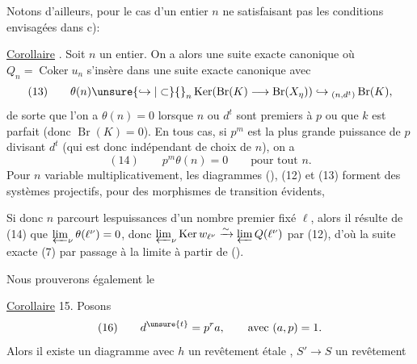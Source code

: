 
Notons d'ailleurs, pour le cas d'un entier $n$ ne satisfaisant pas  les conditions envisagées dans c):

\uline{Corollaire} . Soit $n$ un entier. On a alors une suite exacte canonique
où $Q_n=\operatorname{Coker}u_n$ s'insère dans une suite exacte canonique
avec
\[
(13)\qquad\theta(n)\unsure{\hookrightarrow|\subset}{}_n\operatorname{Ker}(\operatorname{Br}(K)\longrightarrow\operatorname{Br}(X_\eta))\hookrightarrow{}_{(n,d^t)}\operatorname{Br}(K),
\]
de sorte que l'on a $\theta(n)=0$ lorsque $n$ ou $d^t$ sont premiers à $p$ ou que $k$ est parfait (donc $\operatorname{Br}(K)=0$). En tous cas, si $p^m$ est la plus grande puissance de $p$ divisant $d^t$ (qui est donc indépendant de choix de $n$), on a
\[
(14)\qquad p^m\theta(n)=0\qquad\text{pour tout }n.
\]
Pour $n$ variable multiplicativement, les  diagrammes (), (12) et (13) forment des systèmes projectifs, pour des morphismes de transition évidents, 

Si donc $n$ parcourt lespuissances d'un nombre premier fixé $\ell$, alors il résulte de (14) que $\varprojlim_\nu\theta(\ell^\nu)=0$,  donc $\varprojlim_\nu\operatorname{Ker}w_{\ell^\nu}\xrightarrow{\sim}\varprojlim Q(\ell^\nu)$  par (12), d'où la suite exacte (7) par passage à la limite à partir de ().

Nous prouverons également le

\uline{Corollaire} 15. Posons
\[
(16)\qquad d^{\unsure{t}}=p^r a,\qquad\text{avec }(a,p)=1.
\]
Alors il existe un  diagramme
avec $h$ un revêtement étale , $S'\longrightarrow S$ un revêtement

